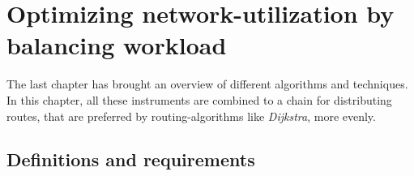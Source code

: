 \chapter{Optimizing network-utilization by balancing workload}
\label{chap:balancing}

The last chapter has brought an overview of different algorithms and techniques.
In this chapter, all these instruments are combined to a chain for distributing routes, that are preferred by routing-algorithms like \textit{Dijkstra}, more evenly.

\section{Definitions and requirements}





